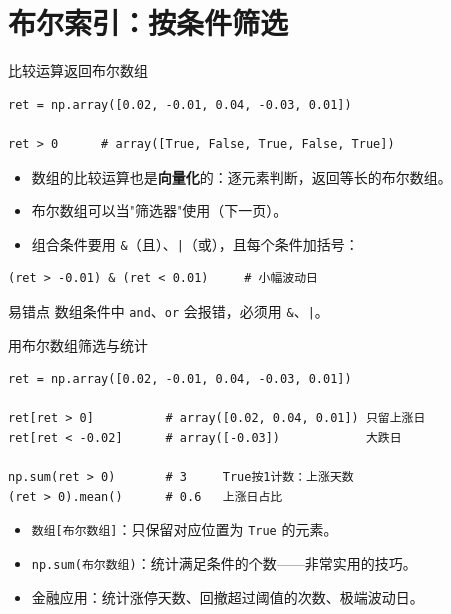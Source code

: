 \documentclass[9pt]{ctexbeamer}
\begin{document}
\section{布尔索引：按条件筛选}

\begin{frame}[fragile]{比较运算返回布尔数组}
	\begin{lstlisting}
ret = np.array([0.02, -0.01, 0.04, -0.03, 0.01])

ret > 0      # array([True, False, True, False, True])
\end{lstlisting}
	\begin{itemize}
		\item 数组的比较运算也是\textbf{向量化}的：逐元素判断，返回等长的布尔数组。
		\item 布尔数组可以当"筛选器"使用（下一页）。
		\item 组合条件要用 \texttt{\&}（且）、\texttt{|}（或），且每个条件加括号：
	\end{itemize}
	\begin{lstlisting}
(ret > -0.01) & (ret < 0.01)     # 小幅波动日
\end{lstlisting}
	\begin{alertblock}{易错点}
		数组条件中 \texttt{and}、\texttt{or} 会报错，必须用 \texttt{\&}、\texttt{|}。
	\end{alertblock}
\end{frame}

\begin{frame}[fragile]{用布尔数组筛选与统计}
	\begin{lstlisting}
ret = np.array([0.02, -0.01, 0.04, -0.03, 0.01])

ret[ret > 0]          # array([0.02, 0.04, 0.01]) 只留上涨日
ret[ret < -0.02]      # array([-0.03])            大跌日

np.sum(ret > 0)       # 3     True按1计数：上涨天数
(ret > 0).mean()      # 0.6   上涨日占比
\end{lstlisting}
	\begin{itemize}
		\item \texttt{数组[布尔数组]}：只保留对应位置为 \texttt{True} 的元素。
		\item \texttt{np.sum(布尔数组)}：统计满足条件的个数——非常实用的技巧。
		\item 金融应用：统计涨停天数、回撤超过阈值的次数、极端波动日。
	\end{itemize}
\end{frame}
\end{document}
